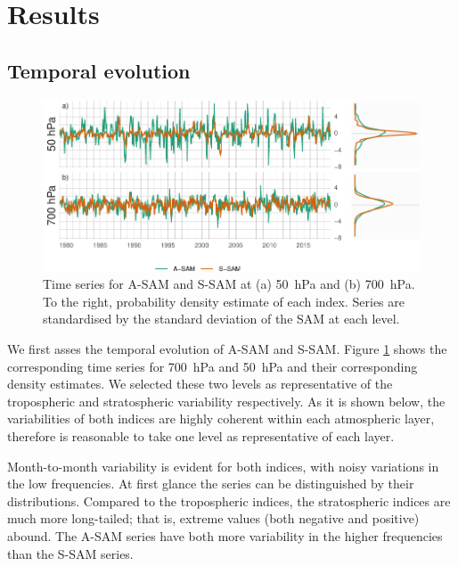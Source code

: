 \documentclass[smallextended]{svjour3}       %
\begin{document}
\hypertarget{results}{%
\section{Results}\label{results}}

\hypertarget{temporal}{%
\subsection{Temporal evolution}\label{temporal}}

\begin{figure}
\includegraphics{asymsam-timeseries-1} \caption{Time series for A\nobreakdash-SAM and S\nobreakdash-SAM at (a) 50~hPa and (b) 700~hPa. To the right, probability density estimate of each index. Series are standardised by the standard deviation of the SAM at each level.}\label{fig:asymsam-timeseries}
\end{figure}

We first asses the temporal evolution of A\nobreakdash-SAM and S\nobreakdash-SAM.
Figure \ref{fig:asymsam-timeseries} shows the corresponding time series for 700~hPa and 50~hPa and their corresponding density estimates.
We selected these two levels as representative of the tropospheric and stratospheric variability respectively.
As it is shown below, the variabilities of both indices are highly coherent within each atmospheric layer, therefore is reasonable to take one level as representative of each layer.

Month-to-month variability is evident for both indices, with noisy variations in the low frequencies.
At first glance the series can be distinguished by their distributions.
Compared to the tropospheric indices, the stratospheric indices are much more long-tailed; that is, extreme values (both negative and positive) abound.
The A\nobreakdash-SAM series have both more variability in the higher frequencies than the S\nobreakdash-SAM series.
\end{document}
